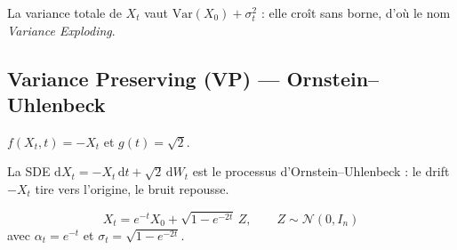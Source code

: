 \documentclass[12pt]{article}
\begin{document}
La variance totale de $X_t$ vaut $\mathrm{Var}(X_0) + \sigma_t^2$ : elle croît sans borne, d'où le nom \textit{Variance Exploding}.


\subsection{Variance Preserving (VP) --- Ornstein--Uhlenbeck}

\begin{hypothesebox}[VP]
\label{hyp:vp}
$f(X_t, t) = -X_t$ et $g(t) = \sqrt{2}$.
\end{hypothesebox}

La SDE $\mathrm{d}X_t = -X_t\,\mathrm{d}t + \sqrt{2}\,\mathrm{d}W_t$ est le processus d'Ornstein--Uhlenbeck : le drift $-X_t$ tire vers l'origine, le bruit repousse.

\begin{resultbox}
\label{res:vp}
\begin{equation}
    \boxed{X_t = e^{-t} X_0 + \sqrt{1 - e^{-2t}}\, Z, \qquad Z \sim \mathcal{N}(0, I_n)}
    \label{eq:vp_marginal}
\end{equation}
avec $\alpha_t = e^{-t}$ et $\sigma_t = \sqrt{1 - e^{-2t}}$.
\end{resultbox}
\end{document}
